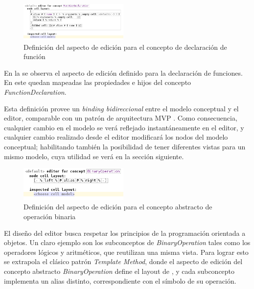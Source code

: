 \begin{figure}[hb]
\centering
\includegraphics[width=0.48\textwidth]{assets/function_declaration_editor}
\caption{Definición del aspecto de edición para el concepto de declaración de función}
\label{fig:function_declaration_editor}
\end{figure}

En la  se observa el aspecto de edición definido para la declaración de funciones. En este quedan mapeadas las propiedades e hijos del concepto \textit{FunctionDeclaration}. 


Esta definición provee un \textit{binding bidireccional} entre el modelo conceptual y el editor, comparable con un patrón de arquitectura MVP \cite{martinfowler}\cite{microsoftwpf}. Como consecuencia, cualquier cambio en el modelo se verá reflejado instantáneamente en el editor, y cualquier cambio realizado desde el editor modificará los nodos del modelo conceptual; habilitando también la posibilidad de tener diferentes vistas para un mismo modelo, cuya utilidad se verá en la sección siguiente.



\begin{figure}[hb]
\centering
\includegraphics[width=0.48\textwidth]{assets/editor_binary_operation}
\caption{Definición del aspecto de edición para el concepto abstracto de operación binaria}
\label{fig:editor_binary_operation}
\end{figure}


El diseño del editor busca respetar los principios de la programación orientada a objetos. Un claro ejemplo son los subconceptos de \textit{BinaryOperation} tales como los operadores lógicos y aritméticos, que reutilizan una misma vista. Para lograr esto se extrapola el clásico patrón \textit{Template Method}\cite{Gamma}, donde el aspecto de edición del concepto abstracto \textit{BinaryOperation} define el layout de , y cada subconcepto implementa un alias distinto, correspondiente con el símbolo de su operación.

